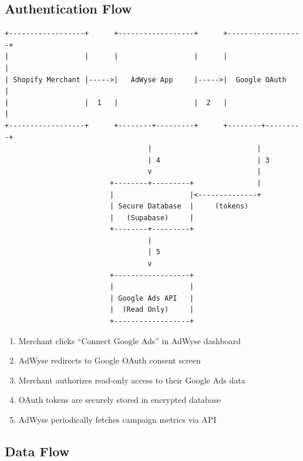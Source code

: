 \documentclass[11pt,a4paper]{article}
\begin{document}
\subsection{Authentication Flow}

\begin{small}
\begin{verbatim}
+------------------+      +------------------+      +------------------+
|                  |      |                  |      |                  |
| Shopify Merchant |----->|   AdWyse App     |----->|  Google OAuth    |
|                  |  1   |                  |  2   |                  |
+------------------+      +--------+---------+      +--------+---------+
                                  |                         |
                                  | 4                       | 3
                                  v                         |
                         +--------+---------+               |
                         |                  |<--------------+
                         | Secure Database  |     (tokens)
                         |   (Supabase)     |
                         +--------+---------+
                                  |
                                  | 5
                                  v
                         +------------------+
                         |                  |
                         | Google Ads API   |
                         |  (Read Only)     |
                         +------------------+
\end{verbatim}
\end{small}

\begin{enumerate}
    \item Merchant clicks ``Connect Google Ads'' in AdWyse dashboard
    \item AdWyse redirects to Google OAuth consent screen
    \item Merchant authorizes read-only access to their Google Ads data
    \item OAuth tokens are securely stored in encrypted database
    \item AdWyse periodically fetches campaign metrics via API
\end{enumerate}

\subsection{Data Flow}
\end{document}
